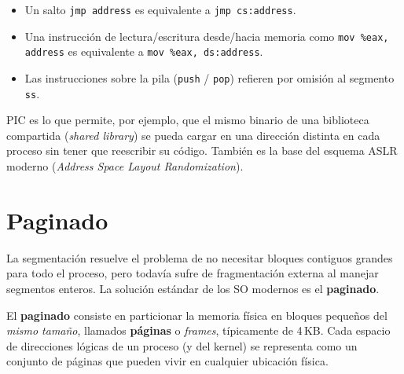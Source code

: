 \documentclass[11pt,a4paper]{article}
\begin{document}
\begin{itemize}[leftmargin=*,nosep]
    \item Un salto \verb|jmp address| es equivalente a
        \verb|jmp cs:address|.
    \item Una instrucción de lectura/escritura desde/hacia memoria
        como \verb|mov %eax, address| es equivalente a
        \verb|mov %eax, ds:address|.
    \item Las instrucciones sobre la pila (\verb|push| / \verb|pop|)
        refieren por omisión al segmento \verb|ss|.
\end{itemize}

\begin{idea}
PIC es lo que permite, por ejemplo, que el mismo binario de una
biblioteca compartida (\emph{shared library}) se pueda cargar en una
dirección distinta en cada proceso sin tener que reescribir su código.
También es la base del esquema ASLR moderno (\emph{Address Space Layout
Randomization}).
\end{idea}

\section{Paginado}

La segmentación resuelve el problema de no necesitar bloques contiguos
grandes para todo el proceso, pero todavía sufre de fragmentación
externa al manejar segmentos enteros. La solución estándar de los SO
modernos es el \textbf{paginado}.

\begin{definicion}
El \textbf{paginado} consiste en particionar la memoria física en
bloques pequeños del \emph{mismo tamaño}, llamados \textbf{páginas} o
\emph{frames}, típicamente de 4\,KB. Cada espacio de direcciones lógicas
de un proceso (y del kernel) se representa como un conjunto de páginas
que pueden vivir en cualquier ubicación física.
\end{definicion}

\begin{center}
\end{center}
\end{document}
